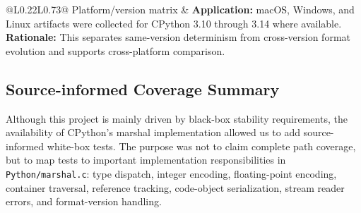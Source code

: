 \documentclass[10pt,a4paper]{article}
\begin{document}
\begin{longtable}{@{}L{0.22\linewidth}L{0.73\linewidth}@{}}
Platform/version matrix &
\textbf{Application:} macOS, Windows, and Linux artifacts were collected for CPython 3.10 through 3.14 where available. \newline
\textbf{Rationale:} This separates same-version determinism from cross-version format evolution and supports cross-platform comparison. \\

\bottomrule
\end{longtable}
\endgroup

\subsection*{Source-informed Coverage Summary}

Although this project is mainly driven by black-box stability requirements, the availability of CPython's marshal implementation allowed us to add source-informed white-box tests. The purpose was not to claim complete path coverage, but to map tests to important implementation responsibilities in \texttt{Python/marshal.c}: type dispatch, integer encoding, floating-point encoding, container traversal, reference tracking, code-object serialization, stream reader errors, and format-version handling.

\begingroup
\small
\setlength{\tabcolsep}{5pt}
\renewcommand{\arraystretch}{1.10}
\end{document}
